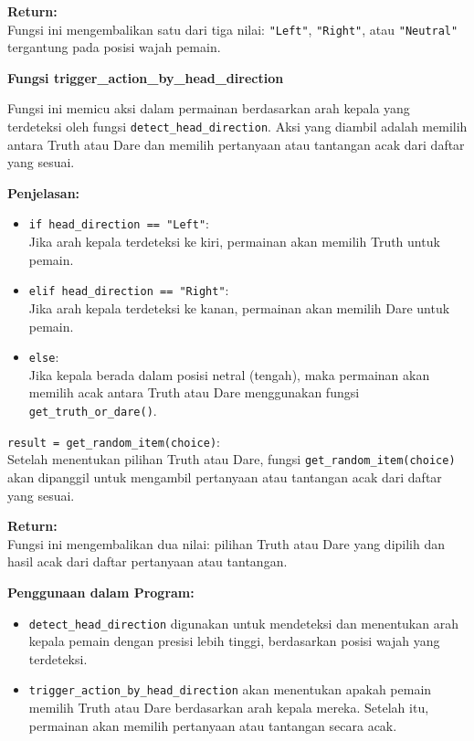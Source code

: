 \documentclass[11pt,a4paper]{article}
\begin{document}
\textbf{Return:} \\
Fungsi ini mengembalikan satu dari tiga nilai: \texttt{"Left"}, \texttt{"Right"}, atau \texttt{"Neutral"} tergantung pada posisi wajah pemain.

\textbf{Fungsi trigger\_action\_by\_head\_direction} 

Fungsi ini memicu aksi dalam permainan berdasarkan arah kepala yang terdeteksi oleh fungsi \texttt{detect\_head\_direction}. Aksi yang diambil adalah memilih antara Truth atau Dare dan memilih pertanyaan atau tantangan acak dari daftar yang sesuai.

\textbf{Penjelasan:} \\
\begin{itemize}
    \item \texttt{if head\_direction == "Left"}: \\
    Jika arah kepala terdeteksi ke kiri, permainan akan memilih Truth untuk pemain.
    \item \texttt{elif head\_direction == "Right"}: \\
    Jika arah kepala terdeteksi ke kanan, permainan akan memilih Dare untuk pemain.
    \item \texttt{else}: \\
    Jika kepala berada dalam posisi netral (tengah), maka permainan akan memilih acak antara Truth atau Dare menggunakan fungsi \texttt{get\_truth\_or\_dare()}.
\end{itemize}

\texttt{result = get\_random\_item(choice)}: \\
Setelah menentukan pilihan Truth atau Dare, fungsi \texttt{get\_random\_item(choice)} akan dipanggil untuk mengambil pertanyaan atau tantangan acak dari daftar yang sesuai.

\textbf{Return:} \\
Fungsi ini mengembalikan dua nilai: pilihan Truth atau Dare yang dipilih dan hasil acak dari daftar pertanyaan atau tantangan.

\textbf{Penggunaan dalam Program:} \\
\begin{itemize}
    \item \texttt{detect\_head\_direction} digunakan untuk mendeteksi dan menentukan arah kepala pemain dengan presisi lebih tinggi, berdasarkan posisi wajah yang terdeteksi.
    \item \texttt{trigger\_action\_by\_head\_direction} akan menentukan apakah pemain memilih Truth atau Dare berdasarkan arah kepala mereka. Setelah itu, permainan akan memilih pertanyaan atau tantangan secara acak.
\end{itemize}
\end{document}
